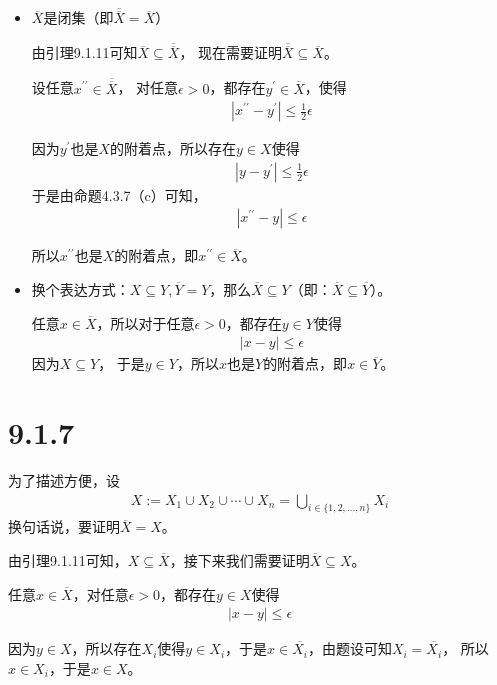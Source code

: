 \documentclass{article}
\begin{document}
\begin{itemize}
      \item $\overline{X}$是闭集（即$\overline{\overline{X}} = \overline{X}$）

            由引理9.1.11可知$\overline{X} \subseteq \overline{\overline{X}}$，
            现在需要证明$\overline{\overline{X}} \subseteq \overline{X}$。

            设任意$x^{\prime\prime} \in \overline{\overline{X}}$，
            对任意$\epsilon > 0$，都存在$y^\prime \in \overline{X}$，使得
            \begin{align*}
                  |x^{\prime\prime} - y^\prime| \leq \frac{1}{2} \epsilon
            \end{align*}

            因为$y^\prime$也是$X$的附着点，所以存在$y \in X$使得
            \begin{align*}
                  |y - y^\prime| \leq \frac{1}{2} \epsilon
            \end{align*}
            于是由命题4.3.7（c）可知，
            \begin{align*}
                  |x^{\prime\prime} - y| \leq \epsilon
            \end{align*}

            所以$x^{\prime\prime}$也是$X$的附着点，即$x^{\prime\prime} \in \overline{X}$。

      \item 换个表达方式：$X \subseteq Y, \overline{Y} = Y$，那么$\overline{X} \subseteq Y$（即：$\overline{X} \subseteq \overline{Y}$）。

            任意$x \in \overline{X}$，所以对于任意$\epsilon > 0$，都存在$y \in Y$使得
            \begin{align*}
                  |x - y| \leq \epsilon
            \end{align*}
            因为$X \subseteq Y$，
            于是$y \in Y$，所以$x$也是$Y$的附着点，即$x \in \overline{Y}$。
\end{itemize}

\section*{9.1.7}
为了描述方便，设
\begin{align*}
      X := X_1 \cup X_2 \cup \cdots \cup X_n = \bigcup_{i \in \{1,2,...,n\}} X_i
\end{align*}
换句话说，要证明$\overline{X} = X$。

由引理9.1.11可知，$X \subseteq \overline{X}$，接下来我们需要证明$\overline{X} \subseteq X$。

任意$x \in \overline{X}$，对任意$\epsilon > 0$，都存在$y \in X$使得
\begin{align*}
      |x - y| \leq \epsilon
\end{align*}

因为$y \in X$，所以存在$X_i$使得$y \in X_i$，于是$x \in \overline{X_i}$，由题设可知$X_i = \overline{X_i}$，
所以$x \in X_i$，于是$x \in X$。
\end{document}
